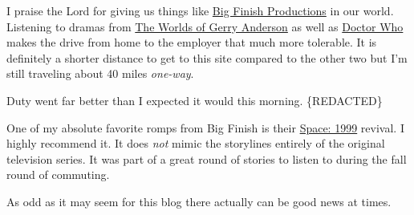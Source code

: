 I praise the Lord for giving us things like
\href{https://bigfinish.com/}{Big Finish Productions} in our world.
Listening to dramas from
\href{https://www.bigfinish.com/collections/v/the-worlds-of-gerry-anderson}{The
Worlds of Gerry Anderson} as well as
\href{https://www.bigfinish.com/hubs/v/doctor-who}{Doctor Who} makes the
drive from home to the employer that much more tolerable. It is
definitely a shorter distance to get to this site compared to the other
two but I'm still traveling about 40 miles \emph{one-way}.

Duty went far better than I expected it would this morning. \{REDACTED\}

One of my absolute favorite romps from Big Finish is their
\href{https://www.bigfinish.com/ranges/v/space-1999}{Space: 1999}
revival. I highly recommend it. It does \emph{not} mimic the storylines
entirely of the original television series. It was part of a great round
of stories to listen to during the fall round of commuting.

As odd as it may seem for this blog there actually can be good news at
times.
